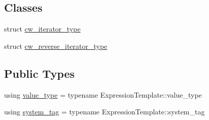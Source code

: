 \subsection*{Classes}
\begin{DoxyCompactItemize}
\item 
struct \hyperlink{structbc_1_1tensors_1_1Expression__Base_1_1cw__iterator__type}{cw\+\_\+iterator\+\_\+type}
\item 
struct \hyperlink{structbc_1_1tensors_1_1Expression__Base_1_1cw__reverse__iterator__type}{cw\+\_\+reverse\+\_\+iterator\+\_\+type}
\end{DoxyCompactItemize}
\subsection*{Public Types}
\begin{DoxyCompactItemize}
\item 
using \hyperlink{classbc_1_1tensors_1_1Expression__Base_acda5b4e228c9b3cb9174258d5caf860a}{value\+\_\+type} = typename Expression\+Template\+::value\+\_\+type
\item 
using \hyperlink{classbc_1_1tensors_1_1Expression__Base_a7c54328db22f61f881e7607b5a69b8e5}{system\+\_\+tag} = typename Expression\+Template\+::system\+\_\+tag
\end{DoxyCompactItemize}
